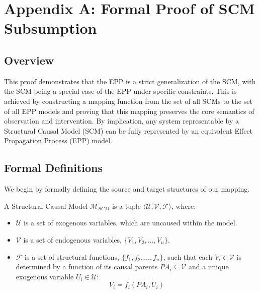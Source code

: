 
\section*{Appendix A: Formal Proof of SCM Subsumption}
\label{appendix:scm_subsumption} 

\subsection*{Overview}

This proof demonstrates that the EPP is a strict generalization of the SCM, with the SCM being a special case of the EPP under specific constraints. This is achieved by constructing a mapping function from the set of all SCMs to the set of all EPP models and proving that this mapping preserves the core semantics of observation and intervention. By implication, any system representable by a Structural Causal Model (SCM) can be fully represented by an equivalent Effect Propagation Process (EPP) model. 

\subsection*{Formal Definitions}

We begin by formally defining the source and target structures of our mapping.

\begin{definition}
A Structural Causal Model \(\mathcal{M}_{SCM}\) is a tuple \(\langle \mathcal{U}, \mathcal{V}, \mathcal{F} \rangle\), where:
\begin{itemize}
    \item \(\mathcal{U}\) is a set of exogenous variables, which are uncaused within the model.
    \item \(\mathcal{V}\) is a set of endogenous variables, \(\{V_1, V_2, \dots, V_n\}\).
    \item \(\mathcal{F}\) is a set of structural functions, \(\{f_1, f_2, \dots, f_n\}\), such that each \(V_i \in \mathcal{V}\) is determined by a function of its causal parents \(PA_i \subseteq \mathcal{V}\) and a unique exogenous variable \(U_i \in \mathcal{U}\):
    \[ V_i = f_i(PA_i, U_i) \]
\end{itemize}
\end{definition}

